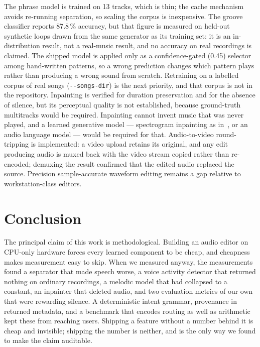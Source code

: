 \documentclass[conference]{IEEEtran}
\begin{document}
The phrase model is trained on 13 tracks, which is thin; the cache mechanism
avoids re-running separation, so scaling the corpus is inexpensive. The groove
classifier reports 87.8\,\% accuracy, but that figure is measured on held-out
synthetic loops drawn from the same generator as its training set: it is an
in-distribution result, not a real-music result, and no accuracy on real
recordings is claimed. The shipped model is applied only as a
confidence-gated (0.45) selector among hand-written patterns, so a wrong
prediction changes which pattern plays rather than producing a wrong sound from
scratch. Retraining on a labelled corpus of real songs
(\texttt{-{}-songs-dir}) is the next priority, and that corpus is not in the
repository. Inpainting is verified for duration preservation and
for the absence of silence, but its perceptual quality is not established,
because ground-truth multitracks would be required. Inpainting cannot invent
music that was never played, and a learned generative model --- spectrogram
inpainting as in~\cite{bazin2020spectrogram}, or an audio language model --- would be required for that.
Audio-to-video round-tripping is implemented: a video upload retains its
original, and any edit producing audio is muxed back with the video stream
copied rather than re-encoded; demuxing the result confirmed that the edited
audio replaced the source. Precision sample-accurate waveform editing remains a
gap relative to workstation-class editors.

\section{Conclusion}

The principal claim of this work is methodological. Building an audio editor on
CPU-only hardware forces every learned component to be cheap, and cheapness
makes measurement easy to skip. When we measured anyway, the measurements found
a separator that made speech worse, a voice activity detector that returned
nothing on ordinary recordings, a melodic model that had collapsed to a
constant, an inpainter that deleted audio, and two evaluation metrics of our
own that were rewarding silence. A deterministic intent grammar, provenance in
returned metadata, and a benchmark that encodes routing as well as arithmetic
kept these from reaching users. Shipping a feature without a number behind it is
cheap and invisible; shipping the number is neither, and is the only way we
found to make the claim auditable.
\end{document}
